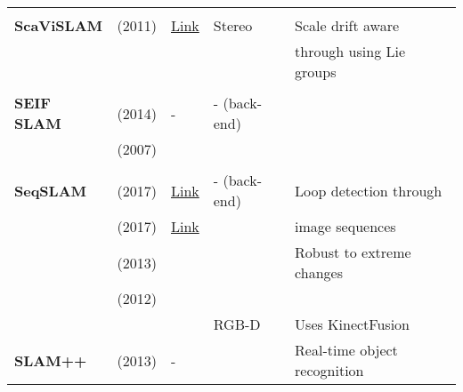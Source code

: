\documentclass[a4paper,12pt]{scrartcl}
\begin{document}
{\begin{longtable}{l|l|l|l|l}
                           &                                   &                                                                    &                       &\\
    \textbf{ScaViSLAM}     & \cite{Strasdat2011} (2011)        & {\href{https://github.com/strasdat/ScaViSLAM}{Link}}               & Stereo                & Scale drift aware\\
                           &                                   &                                                                    &                       & through using Lie groups\\
                           &                                   &                                                                    &                       &\\
    \textbf{SEIF SLAM}     & \cite{Torres-Gonzalez2014} (2014) & -                                                                  & - (back-end)          &\\
                           & \cite{Walter2007} (2007)          &                                                                    &                       &\\
                           &                                   &                                                                    &                       &\\
    \textbf{SeqSLAM}       & \cite{bai2017} (2017)             & {\href{https://github.com/subokita/OpenSeqSLAM}{Link}}             & - (back-end)          & Loop detection through\\
                           & \cite{Siam2017} (2017)            & {\href{https://github.com/siam1251/Fast-SeqSLAM}{Link}}            &                       & image sequences\\
                           & \cite{Sunderhauf2013} (2013)      &                                                                    &                       & Robust to extreme changes\\
                           & \cite{Milford2012} (2012)         &                                                                    &                       &\\
                           &                                   &                                                                    & RGB-D                 & Uses KinectFusion\\
    \textbf{SLAM++}        & \cite{Salas-moreno2013} (2013)    & -                                                                  &                       & Real-time object recognition\\

\end{longtable}}
\end{document}
